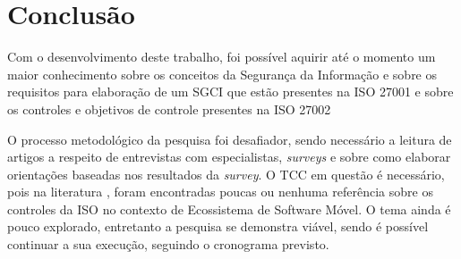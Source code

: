  \chapter{\label{chap:intro}Conclusão}
 
 Com o desenvolvimento deste trabalho, foi possível aquirir até o momento um maior conhecimento sobre os conceitos da Segurança da Informação e sobre os requisitos para elaboração de um SGCI que estão presentes na ISO 27001 e sobre os controles e objetivos de controle presentes na ISO 27002
 
 
 O processo metodológico da pesquisa foi desafiador, sendo necessário a leitura de artigos a respeito de entrevistas com especialistas, \textit{surveys} e sobre como elaborar orientações baseadas nos resultados da \textit{survey}. O TCC em questão é necessário, pois na literatura  \cite{caio2019}, foram encontradas poucas ou nenhuma referência sobre os controles da ISO no contexto de Ecossistema de Software Móvel. O tema ainda é pouco explorado, entretanto a pesquisa se demonstra viável, sendo é possível continuar a sua execução, seguindo o cronograma previsto. 